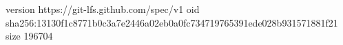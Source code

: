 version https://git-lfs.github.com/spec/v1
oid sha256:13130f1c8771b0c3a7e2446a02eb0a0fc734719765391ede028b931571881f21
size 196704
